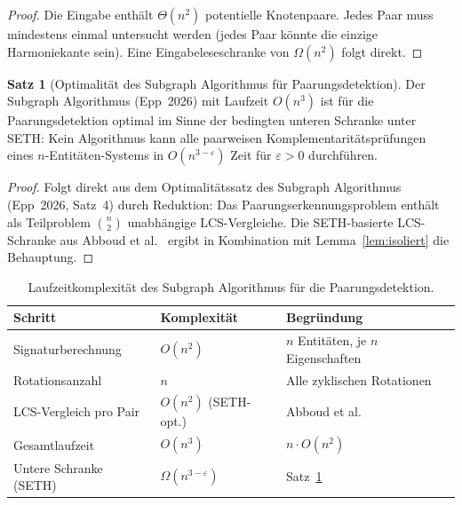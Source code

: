 ﻿\documentclass[a4paper,12pt]{article}
\theoremstyle{definition}
\newtheorem{satz}{Satz}
\begin{document}
\begin{proof}
	Die Eingabe enthält $\Theta(n^2)$ potentielle Knotenpaare. Jedes Paar muss mindestens
	einmal untersucht werden (jedes Paar könnte die einzige Harmoniekante sein).
	Eine Eingabeleseschranke von $\Omega(n^2)$ folgt direkt.
\end{proof}

\begin{satz}[Optimalität des Subgraph Algorithmus für Paarungsdetektion]
	\label{satz:opt_paar}
	Der Subgraph Algorithmus (Epp~2026) mit Laufzeit $O(n^3)$ ist für die
	Paarungsdetektion optimal im Sinne der bedingten unteren Schranke unter SETH:
	Kein Algorithmus kann alle paarweisen Komplementaritätsprüfungen eines
	$n$-Entitäten-Systems in $O(n^{3-\varepsilon})$ Zeit für $\varepsilon > 0$
	durchführen.
\end{satz}

\begin{proof}
	Folgt direkt aus dem Optimalitätssatz des Subgraph Algorithmus (Epp~2026, Satz~4)
	durch Reduktion: Das Paarungserkennungsproblem enthält als Teilproblem
	$\binom{n}{2}$ unabhängige LCS-Vergleiche. Die SETH-basierte
	LCS-Schranke aus Abboud et al.~\cite{abboud2015} ergibt in Kombination
	mit Lemma~\ref{lem:isoliert} die Behauptung.
\end{proof}

\begin{table}[h]
	\centering
	\caption{Laufzeitkomplexität des Subgraph Algorithmus für die Paarungsdetektion.}
	\label{tab:komplexitaet}
	\renewcommand{\arraystretch}{1.25}
	\begin{tabular}{lll}
		\toprule
		\textbf{Schritt} & \textbf{Komplexität} & \textbf{Begründung} \\
		\midrule
		Signaturberechnung       & $O(n^2)$         & $n$ Entitäten, je $n$ Eigenschaften \\
		Rotationsanzahl          & $n$              & Alle zyklischen Rotationen \\
		LCS-Vergleich pro Pair   & $O(n^2)$ (SETH-opt.) & Abboud et al.~\cite{abboud2015} \\
		Gesamtlaufzeit           & $O(n^3)$         & $n \cdot O(n^2)$ \\
		Untere Schranke (SETH)   & $\Omega(n^{3-\varepsilon})$ & Satz~\ref{satz:opt_paar} \\
		\bottomrule
	\end{tabular}
\end{table}

\end{document}
